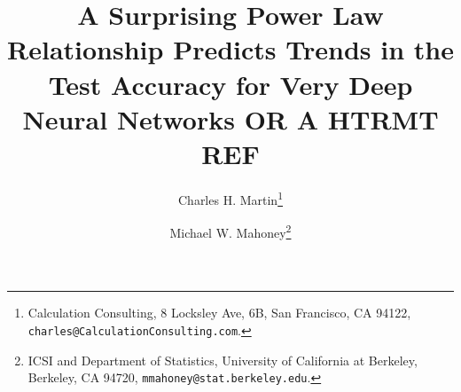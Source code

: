 \documentclass[11pt]{article}
\begin{document}
\title{%
A Surprising Power Law Relationship Predicts Trends in the Test Accuracy for Very Deep Neural Networks
 OR A HTRMT REF
}

\author{%
Charles H. Martin\thanks{Calculation Consulting, 8 Locksley Ave, 6B, San Francisco, CA 94122, \texttt{charles@CalculationConsulting.com}.} 
\and 
Michael W. Mahoney\thanks{ICSI and Department of Statistics, University of California at Berkeley, Berkeley, CA 94720, \texttt{mmahoney@stat.berkeley.edu}.}
}


\date{}
\maketitle







\appendix



%


{\small
%
%

}
\end{document}
